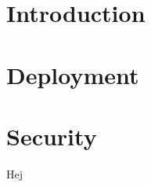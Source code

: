\documentclass[a4paper]{article}
\begin{document}

\vfill


\newpage
\tableofcontents
\todototoc
\listoftodos
\newpage

\section{Introduction}%
\label{sec:introduction}



\section{Deployment}%
\label{sec:deployment}

\section{Security}%
\label{sec:security}




%

Hej ~\cite{MenderDocs}

{}

\end{document}
